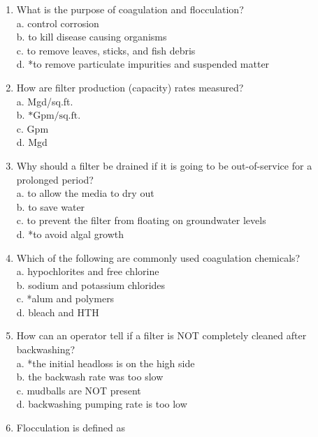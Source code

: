 \begin{enumerate}
\item What is the purpose of coagulation and flocculation?\\
a. control corrosion\\
b. to kill disease causing organisms\\
c. to remove leaves, sticks, and fish debris\\
d. *to remove particulate impurities and suspended matter\\
\item How are filter production (capacity) rates measured?\\
a. Mgd/sq.ft.\\
b. $* \mathrm{Gpm} / \mathrm{sq} . \mathrm{ft}$.\\
c. $\mathrm{Gpm}$\\
d. Mgd\\
\item Why should a filter be drained if it is going to be out-of-service for a prolonged period?\\
a. to allow the media to dry out\\
b. to save water\\
c. to prevent the filter from floating on groundwater levels\\
d. *to avoid algal growth\\
\item Which of the following are commonly used coagulation chemicals?\\
a. hypochlorites and free chlorine\\
b. sodium and potassium chlorides\\
c. *alum and polymers\\
d. bleach and HTH\\
\item How can an operator tell if a filter is NOT completely cleaned after backwashing?\\
a. *the initial headloss is on the high side\\
b. the backwash rate was too slow\\
c. mudballs are NOT present\\
d. backwashing pumping rate is too low\\
\item Flocculation is defined as\\

\end{enumerate}
